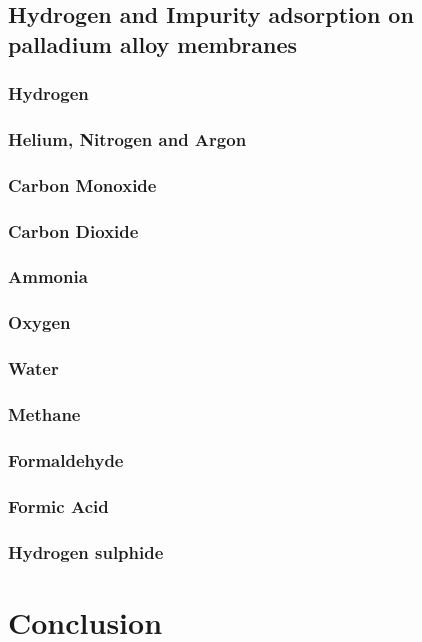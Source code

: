 \subsection{Hydrogen and Impurity adsorption on palladium alloy membranes}
\subsubsection{Hydrogen}
\subsubsection{Helium, Nitrogen and Argon}
\subsubsection{Carbon Monoxide}
\subsubsection{Carbon Dioxide}
\subsubsection{Ammonia}
\subsubsection{Oxygen}
\subsubsection{Water}
\subsubsection{Methane}
\subsubsection{Formaldehyde}
\subsubsection{Formic Acid}
\subsubsection{Hydrogen sulphide}

\section{Conclusion}

